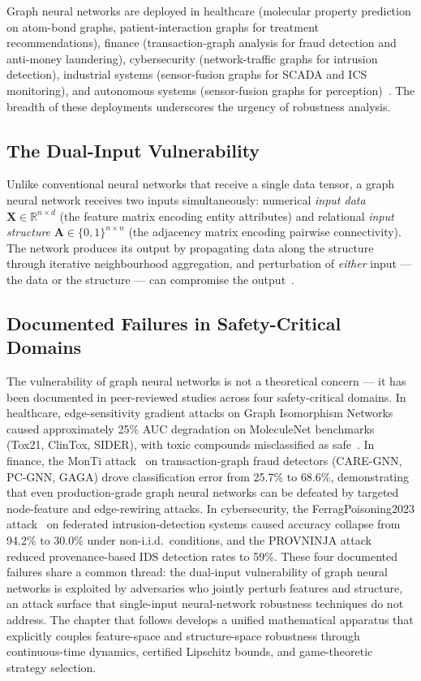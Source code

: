 Graph neural networks are deployed in healthcare (molecular property prediction on atom-bond graphs, patient-interaction graphs for treatment recommendations), finance (transaction-graph analysis for fraud detection and anti-money laundering), cybersecurity (network-traffic graphs for intrusion detection), industrial systems (sensor-fusion graphs for SCADA and ICS monitoring), and autonomous systems (sensor-fusion graphs for perception)~\cite{Goodfellow2014gan,Gilmer2017,Gilmer2018,Ying2021,Wu2021,Luo2021}. The breadth of these deployments underscores the urgency of robustness analysis.

\subsection{The Dual-Input Vulnerability}

Unlike conventional neural networks that receive a single data tensor, a graph neural network receives two inputs simultaneously: numerical \emph{input data} $\mathbf{X}\in\mathbb{R}^{n\times d}$ (the feature matrix encoding entity attributes) and relational \emph{input structure} $\mathbf{A}\in\{0,1\}^{n\times n}$ (the adjacency matrix encoding pairwise connectivity). The network produces its output by propagating data along the structure through iterative neighbourhood aggregation, and perturbation of \emph{either} input --- the data or the structure --- can compromise the output~\cite{Zuegner2018,Bojchevski2019,Dai2018}.

\subsection{Documented Failures in Safety-Critical Domains}

The vulnerability of graph neural networks is not a theoretical concern --- it has been documented in peer-reviewed studies across four safety-critical domains. In healthcare, edge-sensitivity gradient attacks on Graph Isomorphism Networks caused approximately 25\% AUC degradation on MoleculeNet benchmarks (Tox21, ClinTox, SIDER), with toxic compounds misclassified as safe~\cite{EdgeSensitivity2025}. In finance, the MonTi attack~\cite{MonTi2025} on transaction-graph fraud detectors (CARE-GNN, PC-GNN, GAGA) drove classification error from 25.7\% to 68.6\%, demonstrating that even production-grade graph neural networks can be defeated by targeted node-feature and edge-rewiring attacks. In cybersecurity, the FerragPoisoning2023 attack~\cite{FerragPoisoning2023} on federated intrusion-detection systems caused accuracy collapse from 94.2\% to 30.0\% under non-i.i.d.\ conditions, and the PROVNINJA attack~\cite{PROVNINJA2023} reduced provenance-based IDS detection rates to 59\%. These four documented failures share a common thread: the dual-input vulnerability of graph neural networks is exploited by adversaries who jointly perturb features and structure, an attack surface that single-input neural-network robustness techniques do not address. The chapter that follows develops a unified mathematical apparatus that explicitly couples feature-space and structure-space robustness through continuous-time dynamics, certified Lipschitz bounds, and game-theoretic strategy selection.

